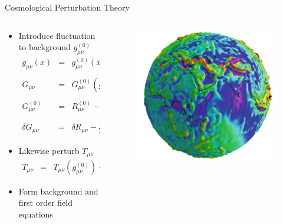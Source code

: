 \documentclass[8pt,aspectratio=1610]{beamer}
\begin{document}
\begin{frame}{Cosmological Perturbation Theory}
	\begin{columns}
		\begin{column}{0.7\linewidth}
			\begin{itemize}
			\item Introduce fluctuation to background $g_{\mu\nu}^{(0)}$
			\begin{eqnarray}
				g_{\mu\nu}(x) &=& g_{\mu\nu}^{(0)}(x) + h_{\mu\nu}(x),\qquad g^{\mu\nu}_{(0)}h_{\mu\nu} \equiv h
				\\ \nonumber\\
				G_{\mu\nu} &=& G^{(0)}_{\mu\nu}(g_{\mu\nu}^{(0)}) + \delta G_{\mu\nu}(h_{\mu\nu})
				\\ \nonumber\\
				G_{\mu\nu}^{(0)} &=& R_{\mu\nu}^{(0)} -\frac{1}{2} g_{\mu\nu}^{(0)} R_\alpha^{(0)\alpha}
				\label{Einzero}
				\\ \nonumber\\
				\delta G_{\mu\nu} &=& \delta R_{\mu\nu} - \frac{1}{2} h_{\mu\nu} R_\alpha^{(0)\alpha} -\frac{1}{2}g_{\mu\nu}\delta R^\alpha{}_\alpha.
			\end{eqnarray}
			\item Likewise perturb $T_{\mu\nu}$
			\begin{eqnarray}
				T_{\mu\nu} &=& T_{\mu\nu}(g_{\mu\nu}^{(0)}) + \delta T_{\mu\nu}(h_{\mu\nu})
			\end{eqnarray}
			\item Form background and first order field equations
			\end{itemize}
		\end{column}
		\begin{column}{0.3\linewidth}
			\begin{figure}[t]
				\includegraphics[width=\linewidth]{sphere_perturb.png}

\end{figure}
\end{column}
\end{columns}
\end{frame}
\end{document}
